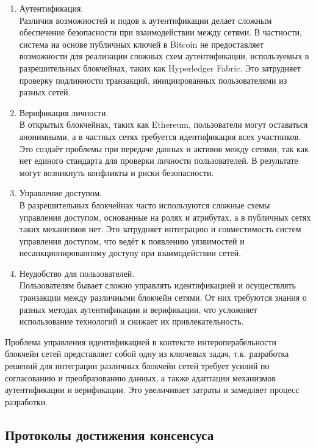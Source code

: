 \begin{enumerate}
	\item Аутентификация.\\
	Различия возможностей и подов к аутентификации делает сложным обеспечение безопасности при взаимодействии между сетями. В частности, система на основе публичных ключей в Bitcoin не предоставляет возможности для реализации сложных схем аутентификации, используемых в разрешительных блокчейнах, таких как Hyperledger Fabric. Это затрудняет проверку подлинности транзакций, инициированных пользователями из разных сетей.

	\item Верификация личности.\\
	В открытых блокчейнах, таких как Ethereum, пользователи могут оставаться анонимными, а в частных сетях требуется идентификация всех участников. Это создаёт проблемы при передаче данных и активов между сетями, так как нет единого стандарта для проверки личности пользователей. В результате могут возникнуть конфликты и риски безопасности.

	\item Управление доступом.\\
	В разрешительных блокчейнах часто используются сложные схемы управления доступом, основанные на ролях и атрибутах, а в публичных сетях таких механизмов нет. Это затрудняет интеграцию и совместимость систем управления доступом, что ведёт к появлению уязвимостей и несанкционированному доступу при взаимодействии сетей.

	\item Неудобство для пользователей.\\
	Пользователям бывает сложно управлять идентификацией и осуществлять транзакции между различными блокчейн сетями. От них требуются знания о разных методах аутентификации и верификации, что усложняет использование технологий и снижает их привлекательность.
\end{enumerate}

Проблема управления идентификацией в контексте интероперабельности блокчейн сетей представляет собой одну из ключевых задач, т.к. разработка решений для интеграции различных блокчейн сетей требует усилий по согласованию и преобразованию данных, а также адаптации механизмов аутентификации и верификации. Это увеличивает затраты и замедляет процесс разработки.

\subsection{Протоколы достижения консенсуса}

